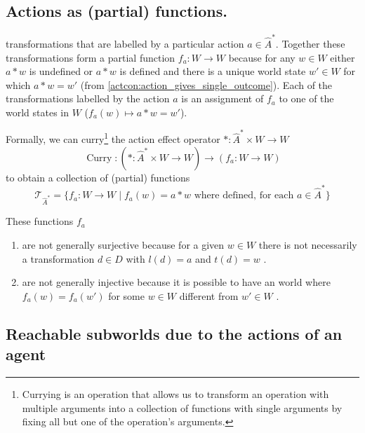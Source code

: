 \subsection{Actions as (partial) functions.}

 transformations that are labelled by a particular action $a \in \hat{A}^{*}$.
Together these transformations form a partial function $f_{a}: W \to W$ because for any $w \in W$ either $a \ast w$ is undefined or $a \ast w$ is defined and there is a unique world state $w' \in W$ for which $a \ast w = w'$ (from \cref{actcon:action_gives_single_outcome}).
Each of the transformations labelled by the action $a$ is an assignment of $f_{a}$ to one of the world states in $W$ ($f_{a}(w) \mapsto a \ast w = w'$).

Formally, we can curry\footnote{Currying is an operation that allows us to transform an operation with multiple arguments into a collection of functions with single arguments by fixing all but one of the operation's arguments.} the action effect operator $\ast : \hat{A}^{*} \times W \to W$
\begin{equation}
	\operatorname{Curry}: (\ast: \hat{A}^{*} \times W \to W) \to (f_{a}: W \to W)
\end{equation}
to obtain a collection of (partial) functions
\begin{equation}
	\mathcal{T}_{\hat{A}^{*}} = \{f_{a}: W \to W \mid f_{a}(w) = a \ast w \text{ where defined, for each } a \in \hat{A}^{*} \}
\end{equation}

These functions $f_{a}$
\begin{enumerate}
    \item are not generally surjective because for a given $w \in W$ there is not necessarily a transformation $d \in D$ with $l(d) = a$ and $t(d) = w$ .

    \item are not generally injective because it is possible to have an world where $f_{a}(w)=f_{a}(w')$ for some $w \in W$ different from $w' \in W$ .
\end{enumerate}


\subsection{Reachable subworlds due to the actions of an agent}

